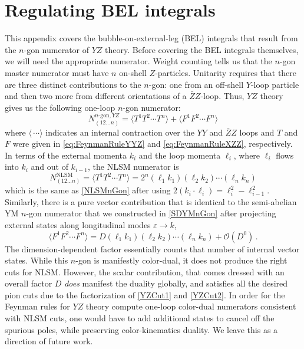 \documentclass[11pt,letter]{article}
\begin{document}
\section{Regulating BEL integrals}\label{BELreg}
This appendix covers the bubble-on-external-leg (BEL) integrals that result from the $n$-gon numerator of $Y\!Z$ theory.
Before covering the BEL integrals themselves, we will need the appropriate numerator.
Weight counting tells us that the $n$-gon master
numerator must have $n$ on-shell $Z$-particles. Unitarity requires
that there are three distinct contributions to the $n$-gon: one from an off-shell $Y$-loop particle and then two more from
different orientations of a $\bar{Z}Z$-loop.  Thus, $YZ$ theory gives
us the following one-loop $n$-gon numerator:
\begin{equation}
N^{n\text{-gon},YZ}_{(12...n)} = \langle T^{1}T^{2}\cdots T^{n}\rangle+ \langle F^1F^2\cdots F^n\rangle
\end{equation}
where $\langle\,\cdots\rangle$ indicates an internal contraction over the $YY$ and
$\bar{Z}Z$ loops and $T$ and $F$ were given in \cref{eq:FeynmanRuleYYZ} and \cref{eq:FeynmanRuleXZZ}, respectively.
In terms of the external momenta $k_i$ and the loop momenta $\ell_i$, where $\ell_i$ flows into $k_i$ and out of $k_{i-1}$, the NLSM numerator is
\begin{equation}
N_{(12...n)}^{\text{NLSM}}=\langle T^{1}T^{2}\cdots T^{n}\rangle =2^n (\ell_1 k_1)(\ell_2 k_2) \cdots (\ell_n k_n)
\end{equation}
which is the same as \cref{NLSMnGon} after using $2(k_i \cdot \ell_i) = \ell_{i}^2-\ell^2_{i-1}$. Similarly, there is a pure vector contribution that is identical to the semi-abelian YM $n$-gon numerator that we constructed in \cref{SDYMnGon} after projecting external states along longitudinal modes $\varepsilon \rightarrow k$,
\begin{equation}
 \langle F^1F^2\cdots F^n \rangle= D (\ell_1 k_1)(\ell_2 k_2) \cdots (\ell_n k_n) + \mathcal{O}(D^0)\, .
\end{equation}
The dimension-dependent factor essentially counts that number of
internal vector states. While this $n$-gon is manifestly color-dual,
it does not produce the right cuts for NLSM. However, the scalar
contribution, that comes dressed with an overall factor $D$
\textit{does} manifest the duality globally, and satisfies all the
desired pion cuts due to the factorization of \cref{YZCut1} and \cref{YZCut2}. In order for the Feynman rules for $Y\!Z$ theory
compute one-loop color-dual numerators consistent with NLSM cuts, one would have to add additional states to cancel off the spurious poles, while
preserving color-kinematics duality. We leave this as a direction of
future work.
\end{document}
